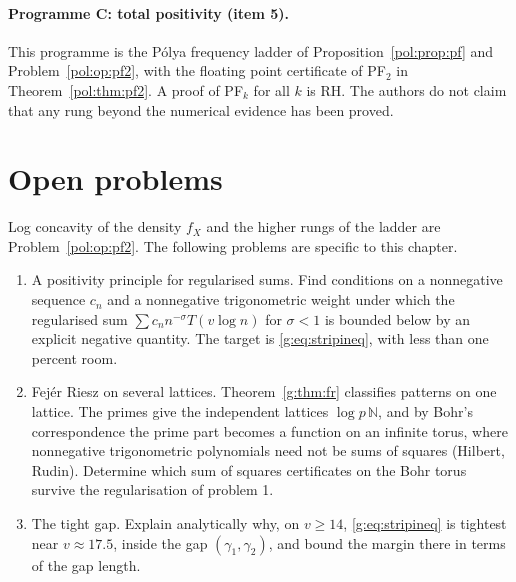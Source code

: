 \paragraph{Programme C: total positivity (item 5).} This programme is the Pólya frequency ladder of Proposition~\ref{pol:prop:pf} and Problem~\ref{pol:op:pf2}, with the floating point certificate of PF$_2$ in Theorem~\ref{pol:thm:pf2}. A proof of PF$_k$ for all $k$ is RH. The authors do not claim that any rung beyond the numerical evidence has been proved.

\section{Open problems}\label{g:sec:open}

Log concavity of the density $f_X$ and the higher rungs of the ladder are Problem~\ref{pol:op:pf2}. The following problems are specific to this chapter.

\begin{enumerate}
\item A positivity principle for regularised sums. Find conditions on a nonnegative sequence $c_n$ and a nonnegative trigonometric weight under which the regularised sum $\sum c_nn^{-\sigma}T(v\log n)$ for $\sigma<1$ is bounded below by an explicit negative quantity. The target is \eqref{g:eq:stripineq}, with less than one percent room.
\item Fej\'er Riesz on several lattices. Theorem~\ref{g:thm:fr} classifies patterns on one lattice. The primes give the independent lattices $\log p\,\mathbb N$, and by Bohr's correspondence the prime part becomes a function on an infinite torus, where nonnegative trigonometric polynomials need not be sums of squares (Hilbert, Rudin). Determine which sum of squares certificates on the Bohr torus survive the regularisation of problem 1.
\item The tight gap. Explain analytically why, on $v\ge14$, \eqref{g:eq:stripineq} is tightest near $v\approx17.5$, inside the gap $(\gamma_1,\gamma_2)$, and bound the margin there in terms of the gap length.
\end{enumerate}
